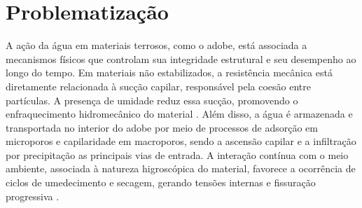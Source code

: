 

\section{Problematização}



A ação da água em materiais terrosos, como o adobe, está associada a mecanismos físicos que controlam sua integridade estrutural e seu desempenho ao longo do tempo. Em materiais não estabilizados, a resistência mecânica está diretamente relacionada à sucção capilar, responsável pela coesão entre partículas. A presença de umidade reduz essa sucção, promovendo o enfraquecimento hidromecânico do material \cite{Gerard2015, Beckett2020, Bui2014}. Além disso, a água é armazenada e transportada no interior do adobe por meio de processos de adsorção em microporos e capilaridade em macroporos, sendo a ascensão capilar e a infiltração por precipitação as principais vias de entrada. A interação contínua com o meio ambiente, associada à natureza higroscópica do material, favorece a ocorrência de ciclos de umedecimento e secagem, gerando tensões internas e fissuração progressiva \cite{Gerard2015, Dieudonne2016, Beckett2020, Bui2014}.

